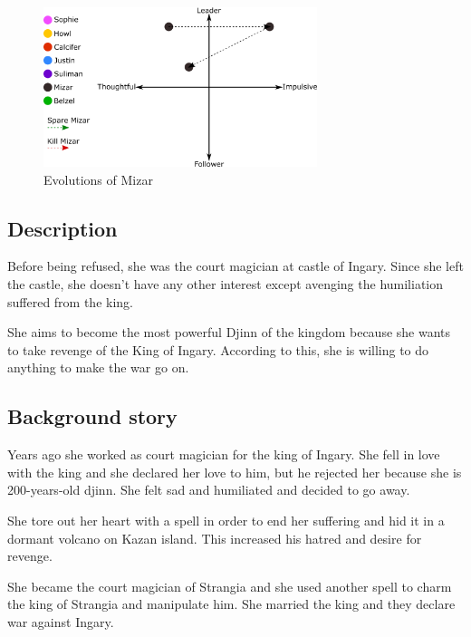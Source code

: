 \begin{figure}[H]
  \centering
  \includegraphics[width=8cm]{Images/SVG/Exported/Evolutions/mizarEvolution}
  \caption{Evolutions of Mizar}
\end{figure}

\subsection{Description}
Before being refused, she was the court magician at castle of Ingary. Since she left the castle, she doesn't have any other interest except avenging the humiliation suffered from the king.

She aims to become the most powerful Djinn of the kingdom because she wants to take revenge of the King of Ingary. According to this, she is willing to do anything to make the war go on.

\subsection{Background story}
Years ago she worked as court magician for the king of Ingary. She fell in love with the king and she declared her love to him, but he rejected her because she is 200-years-old djinn. She felt sad and humiliated and decided to go away.

She tore out her heart with a spell in order to end her suffering and hid it in a dormant volcano on Kazan island. This increased his hatred and desire for revenge.

She became the court magician of Strangia and she used another spell to charm the king of Strangia and manipulate him. She married the king and they declare war against Ingary.
